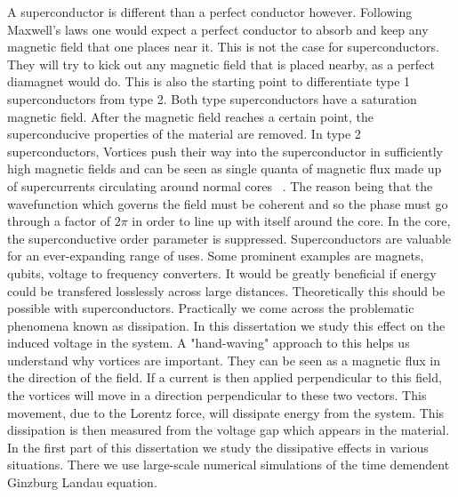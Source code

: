  A superconductor is different than a perfect conductor however. Following Maxwell's laws one would expect a perfect conductor to absorb and keep any magnetic field that one places near it. This is not the case for superconductors. They will try to kick out any magnetic field that is placed nearby, as a perfect diamagnet would do. This is also the starting point to differentiate type 1 superconductors from type 2. Both type superconductors have a saturation magnetic field. After the magnetic field reaches a certain point, the superconducive properties of the material are removed. In type 2 superconductors, Vortices push their way into the superconductor in sufficiently high magnetic fields and can be seen as single quanta of magnetic flux made up of supercurrents circulating around normal cores ~\cite{Kwok16}. The reason being that the wavefunction which governs the field must be coherent and so the phase must go through a factor of $2\pi$ in order to line up with itself around the core. In the core, the superconductive order parameter is suppressed.  
Superconductors are valuable for an ever-expanding range of uses. Some prominent examples are magnets, qubits, voltage to frequency converters. It would be greatly beneficial if energy could be transfered losslessly across large distances. Theoretically this should be possible with superconductors. Practically we come across the problematic phenomena known as dissipation.  In this dissertation we study this effect on the induced voltage in the system. A "hand-waving" approach to this helps us understand why vortices are important. They can be seen as a magnetic flux in the direction of the field. If a current is then applied perpendicular to this field, the vortices will move in a direction perpendicular to these two vectors. This movement, due to the Lorentz force, will dissipate energy from the system. This dissipation is then measured from the voltage gap which appears in the material. In the first part of this dissertation we study the dissipative effects in various situations. There we use large-scale numerical simulations of the time demendent Ginzburg Landau equation.


